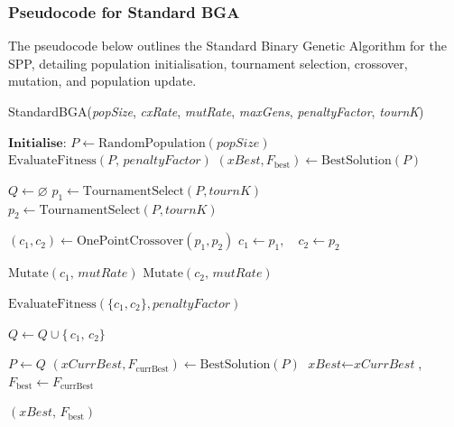 \documentclass[12pt]{article}
\begin{document}
\subsubsection{Pseudocode for Standard BGA}
The pseudocode below outlines the Standard Binary Genetic Algorithm for the SPP, detailing population initialisation, tournament selection, crossover, mutation, and population update.

\begin{algorithm}[htbp]
  \caption{StandardBGA(\textit{popSize}, \textit{cxRate}, \textit{mutRate}, \textit{maxGens}, \textit{penaltyFactor}, \textit{tournK})}
  \label{alg:standard_bga}
  \begin{algorithmic}[1]
    \State \(\textbf{Initialise:}\)
    \State $P \gets \text{RandomPopulation}(\textit{popSize})$ 
    \State $\text{EvaluateFitness}(P,\, \textit{penaltyFactor})$ 
    \State $(\textit{xBest}, F_{\text{best}}) \gets \text{BestSolution}(P)$ 

      \State $Q \gets \varnothing$ 
        \State $p_1 \gets \text{TournamentSelect}(P, \textit{tournK})$ 
        \State $p_2 \gets \text{TournamentSelect}(P, \textit{tournK})$ 
        
          \State $(c_1, c_2) \gets \text{OnePointCrossover}(p_1, p_2)$
        \Else
          \State $c_1 \gets p_1,\quad c_2 \gets p_2$ 
        \EndIf

        \State $\text{Mutate}(c_1,\, \textit{mutRate})$
        \State $\text{Mutate}(c_2,\, \textit{mutRate})$

        \State $\text{EvaluateFitness}(\{c_1, c_2\}, \textit{penaltyFactor})$
        
        \State $Q \gets Q \cup \{\,c_1,\,c_2\}$
      \EndWhile

      \State $P \gets Q$ 
      \State $(\textit{xCurrBest}, F_{\text{currBest}}) \gets \text{BestSolution}(P)$
        \State $\textit{xBest} \gets \textit{xCurrBest}$,\quad $F_{\text{best}} \gets F_{\text{currBest}}$
      \EndIf
    \EndFor
    
    \State \Return $(\textit{xBest},\, F_{\text{best}})$ 
  \end{algorithmic}
\end{algorithm}
\end{document}
